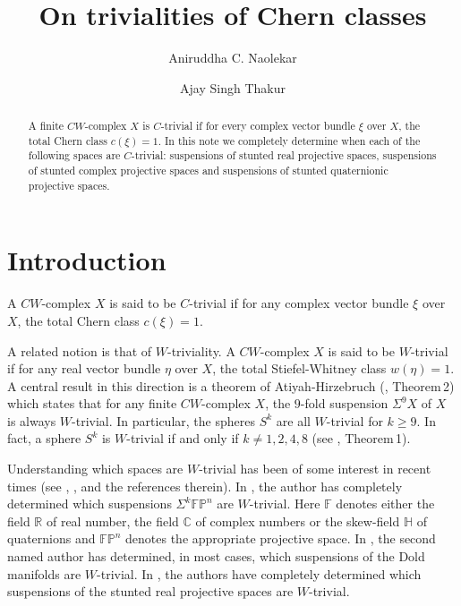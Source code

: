 \documentclass[12pt,reqno]{amsart}
\numberwithin{equation}{subsection}
\theoremstyle{definition}
\begin{document}
\title[]{On trivialities of Chern classes}
\author{Aniruddha C. Naolekar}
\address{Indian Statistical Institute, 8th Mile, Mysore Road, RVCE Post, Bangalore 560059, INDIA.}

\author{ Ajay Singh Thakur}
\address{Department of Mathematics, University of Haifa, Mount Carmel, Haifa 31905, ISRAEL.}

\begin{abstract} A finite $CW$-complex $X$ is $C$-trivial if for every complex vector bundle $\xi$ over $X$, the total Chern class $c(\xi)=1$. In this note we completely determine when each of the following spaces are $C$-trivial: suspensions of stunted real projective spaces, suspensions of stunted complex projective spaces and suspensions of stunted quaternionic projective spaces. 
\end{abstract}


\email{}

\date{}
\maketitle

\section{Introduction}

A $CW$-complex $X$ is said to be $C$-trivial if for any complex vector bundle $\xi$ over $X$, the total Chern class $c(\xi)=1$. 

A related notion is that of $W$-triviality. A $CW$-complex $X$ is said to be $W$-trivial if for any real vector bundle $\eta$ over $X$, the total Stiefel-Whitney class $w(\eta)=1$. A central result in this direction is a theorem of Atiyah-Hirzebruch (\cite{atiyahirz}, Theorem\,2) which states that for any finite $CW$-complex $X$, the $9$-fold suspension $\Sigma^9X$ of $X$ is always $W$-trivial. In particular, the spheres $S^k$ are all $W$-trivial for $k\geq 9$. In fact, a sphere $S^k$ is $W$-trivial if and only if $k\neq 1,2,4,8$ (see \cite{atiyahirz}, Theorem\,1). 

Understanding which spaces 
are $W$-trivial has been of some interest in recent times (see \cite{aniajay}, \cite{tanaka}, \cite{ajay} and the references therein). 
In \cite{tanaka}, the author has completely determined which suspensions $\Sigma^k \mathbb F\mathbb P^n$ are $W$-trivial. Here $\mathbb F$ denotes either the field $\mathbb R$ of real number, the field $\mathbb C$ of complex numbers or the skew-field $\mathbb H$ of quaternions and $\mathbb F\mathbb P^n$ denotes the appropriate projective space. In \cite{ajay}, the second named author has determined, in most cases, which suspensions of the Dold manifolds are $W$-trivial. In \cite{aniajay}, the authors have completely determined which suspensions of the stunted real projective spaces are $W$-trivial. 
\end{document}
